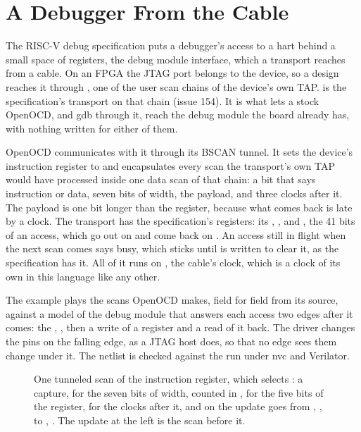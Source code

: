 \section{A Debugger From the Cable}
\label{sec:x-dtm}

The RISC-V debug specification puts a debugger's access to a hart
behind a small space of registers, the debug module interface, which
a transport reaches from a cable. On an FPGA the JTAG port belongs to
the device, so a design reaches it through , one of the
user scan chains of the device's own TAP.  is the
specification's transport on that chain (issue 154). It is what lets
a stock OpenOCD, and gdb through it, reach the debug module the board
already has, with nothing written for either of them.

OpenOCD communicates with it through its BSCAN tunnel. It sets the device's
instruction register to  and encapsulates every scan the
transport's own TAP would have processed inside one data scan of that
chain: a bit that says instruction or data, seven bits of width, the
payload, and three clocks after it. The payload is one bit longer than
the register, because what comes back is late by a clock. The
transport has the specification's registers: its ,
, and , the 41 bits of an access, which go out on
 and come back on . An access still in flight when
the next scan comes says busy, which sticks until  is
written to clear it, as the specification has it. All of it runs on
, the cable's clock, which is a clock of its own in this
language like any other.

The example plays the scans OpenOCD makes, field for field from its
source, against a model of the debug module that answers each access
two edges after it comes: the , , then a
write of a register and a read of it back. The driver changes the
pins on the falling edge, as a JTAG host does, so that no edge sees
them change under it. The netlist is checked against the run under nvc
and Verilator.

\begin{figure}[htbp]
\centering

\caption{One tunneled scan of the instruction register, which selects
: a capture,   for the seven bits of
width, counted in ,  for the five bits of the
register,  for the clocks after it, and on the update
 goes from , , to ,
. The update at the left is the scan before it.}
\label{fig:x-dtm}
\end{figure}




